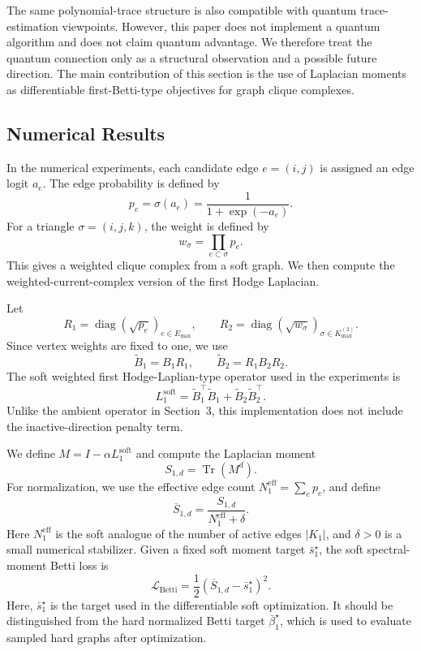\documentclass[pdflatex,sn-mathphys-ay]{sn-jnl}%
\theoremstyle{thmstyleone}%
\theoremstyle{thmstyletwo}%
\theoremstyle{thmstylethree}%
\begin{document}
The same polynomial-trace structure is also compatible with quantum trace-estimation viewpoints. However, this paper does not implement a quantum algorithm and does not claim quantum advantage. We therefore treat the quantum connection only as a structural observation and a possible future direction. The main contribution of this section is the use of Laplacian moments as differentiable first-Betti-type objectives for graph clique complexes.

\subsection{Numerical Results}

In the numerical experiments, each candidate edge \(e=(i,j)\) is assigned an edge logit \(a_e\).
The edge probability is defined by
\[
p_e=\sigma(a_e)
=
\frac{1}{1+\exp(-a_e)}.
\]
For a triangle \(\sigma=(i,j,k)\), the weight is defined by
\[
w_\sigma
=
\prod_{e\subset\sigma}p_e.
\]
This gives a weighted clique complex from a soft graph. We then compute the weighted-current-complex version of the first Hodge Laplacian.

Let
\[
R_1=\operatorname{diag}(\sqrt{p_e})_{e\in E_{\max}},
\qquad
R_2=\operatorname{diag}(\sqrt{w_\sigma})_{\sigma\in K_{\max}^{(2)}}.
\]
Since vertex weights are fixed to one, we use
\[
\widetilde{B}_1=B_1R_1,
\qquad
\widetilde{B}_2=R_1B_2R_2.
\]
The soft weighted first Hodge-Laplian-type operator used in the experiments is
\[
L_1^{\mathrm{soft}}
=
\widetilde{B}_1^\top \widetilde{B}_1
+
\widetilde{B}_2\widetilde{B}_2^\top.
\]
Unlike the ambient operator in Section~3, this implementation does not include the inactive-direction penalty term.

We define \(M
=
I-\alpha L_1^{\mathrm{soft}}\)
and compute the Laplacian moment
\[
S_{1,d}
=
\operatorname{Tr}(M^d).
\]
For normalization, we use the effective edge count \(N_1^{\mathrm{eff}}
=
\sum_e p_e\),
and define
\[
\overline{S}_{1,d}
=
\frac{
S_{1,d}
}{
N_1^{\mathrm{eff}}+\delta
}.
\]
Here \(N_1^{\mathrm{eff}}\) is the soft analogue of the number of active edges \(|K_1|\), and \(\delta>0\) is a small numerical stabilizer.
Given a fixed soft moment target \(\bar{s}_1^\star\), the soft spectral-moment Betti loss is
\[
\mathcal{L}_{\mathrm{Betti}}
=
\frac{1}{2}
\left(
\overline{S}_{1,d}
-
\bar{s}_1^\star
\right)^2.
\]
Here, \(\bar{s}_1^\star\) is the target used in the differentiable soft optimization. It should be distinguished from the hard normalized Betti target \(\bar{\beta}_1^\star\), which is used to evaluate sampled hard graphs after optimization.
\end{document}
